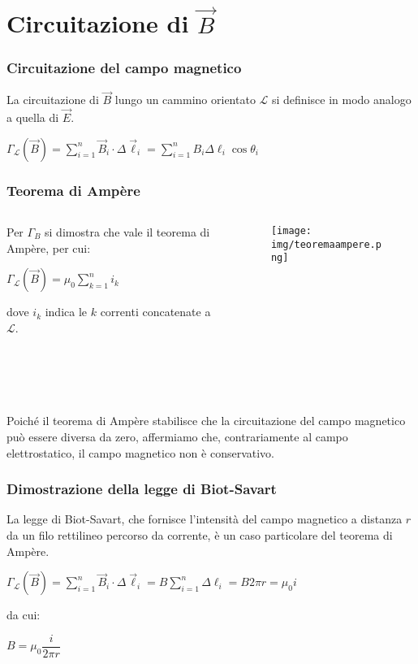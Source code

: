 \documentclass[]{beamer}
\theoremstyle{plain}
\begin{document}
\section{Circuitazione di $ \vec{B} $}

\begin{frame}
  \frametitle{Circuitazione del campo magnetico}
  La circuitazione di $ \vec{B} $ lungo un cammino orientato $ \mathscr{L} $ si definisce in modo analogo a quella di $ \vec{E} $. 
  \begin{center}
   \colorbox{blue!30}{$ \Gamma_\mathscr{L} (\vec{B}) = \sum\limits_{i=1}^n \vec{B}_i \cdot \Delta \vec{\ell}_i =  \sum\limits_{i=1}^n B_i \Delta \ell_i \cos\theta_i $}
   \end{center}
\end{frame}


\begin{frame}
\frametitle{Teorema di Ampère}
\begin{columns}
\begin{column}{0.5\textwidth}
Per $ \Gamma_B $ si dimostra che vale il \alert<1>{teorema di Ampère}, per cui:
\begin{center}
\colorbox{blue!30}{$ \Gamma_\mathscr{L} (\vec{B}) = \mu_0 \sum\limits_{k=1}^n i_k $}
\end{center}
dove $ i_k $ indica le $ k $ correnti concatenate a $ \mathscr{L} $.\pause
\end{column}
\begin{column}{0.4\textwidth}
\begin{figure}
\texttt{[image: img/teoremaampere.png]}
\end{figure}
\end{column}
\end{columns}

~

~
   
Poiché il teorema di Ampère stabilisce che la circuitazione del campo magnetico può essere diversa da zero, affermiamo che, contrariamente al campo elettrostatico, \alert<2>{il campo magnetico non è conservativo}.
\end{frame}

\begin{frame}
  \frametitle{Dimostrazione della legge di Biot-Savart}
  La legge di Biot-Savart, che fornisce l'intensità del campo magnetico a distanza $ r $ da un filo rettilineo percorso da corrente, è un caso particolare del teorema di Ampère.\pause
  \begin{center}
  $ \Gamma_\mathscr{L} (\vec{B}) = \sum\limits_{i=1}^n \vec{B}_i \cdot \Delta \vec{\ell}_i = B \sum\limits_{i=1}^n \Delta \ell_i = B 2 \pi r = \mu_0 i $
  \end{center}
  da cui:
    \begin{center}
   \colorbox{blue!30}{$ B = \mu_0 \dfrac{i}{2\pi r} $}
   \end{center}
\end{frame}
\end{document}
